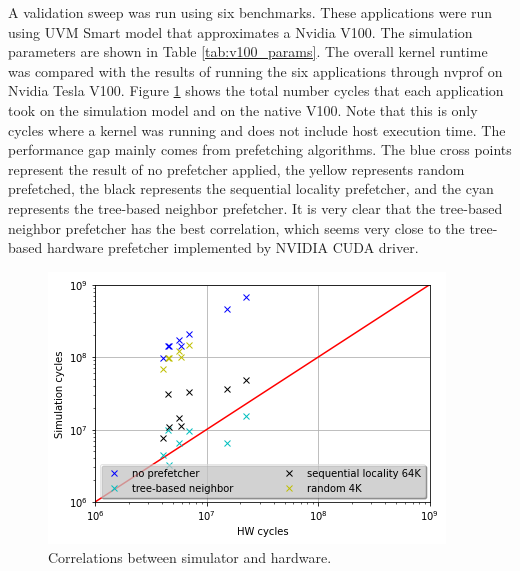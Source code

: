 A validation sweep was run using six benchmarks. These
applications were run using UVM Smart model that approximates a Nvidia V100. The simulation parameters are shown in Table
\ref{tab:v100_params}. The overall kernel runtime was compared with the results
of running the six applications through nvprof on Nvidia Tesla V100. Figure \ref{fig:correlation}
shows the total number cycles that each application took on the simulation model
and on the native V100. Note that this is only cycles where a kernel was running
and does not include host execution time. The performance gap mainly comes from prefetching algorithms. The blue cross points represent the result of no prefetcher applied, the yellow represents random prefetched, the black represents the sequential locality prefetcher, and the cyan represents the tree-based neighbor prefetcher. It is very clear that the tree-based neighbor prefetcher has the best correlation, which seems very close to the tree-based hardware prefetcher implemented by NVIDIA CUDA driver.

   \begin{figure}[!htb]
      \centering
      \setlength{\abovecaptionskip}{6pt plus 1pt minus 1pt}
      \includegraphics[width=.90\textwidth,keepaspectratio]{figures1/corre.elf}
      \captionsetup{width=.75\textwidth}
      \caption{Correlations between simulator and hardware.}
      \label{fig:correlation}
   \end{figure}


